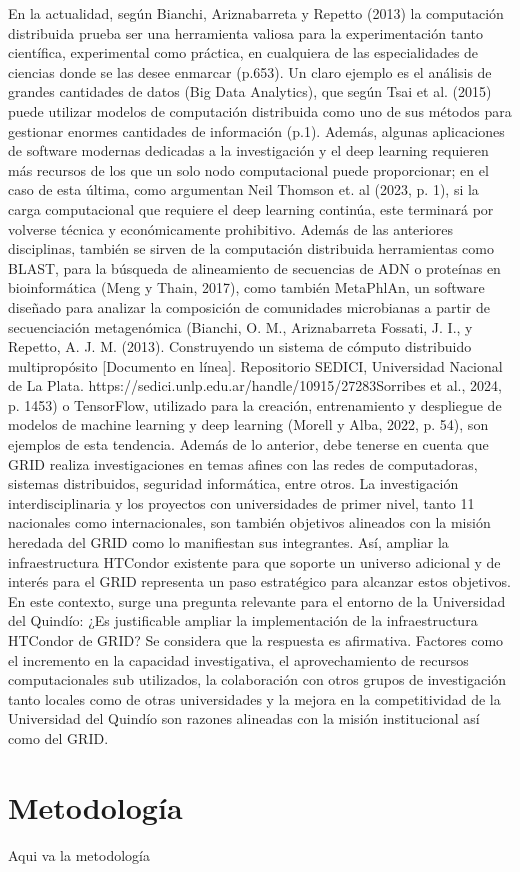 En la actualidad, según Bianchi, Ariznabarreta y Repetto (2013) la computación distribuida
prueba ser una herramienta valiosa para la experimentación tanto científica, experimental como
práctica, en cualquiera de las especialidades de ciencias donde se las desee enmarcar (p.653). Un
claro ejemplo es el análisis de grandes cantidades de datos (Big Data Analytics), que según Tsai
et al. (2015) puede utilizar modelos de computación distribuida como uno de sus métodos para
gestionar enormes cantidades de información (p.1). Además, algunas aplicaciones de software
modernas dedicadas a la investigación y el deep learning requieren más recursos de los que un
solo nodo computacional puede proporcionar; en el caso de esta última, como argumentan Neil
Thomson et. al (2023, p. 1), si la carga computacional que requiere el deep learning continúa,
este terminará por volverse técnica y económicamente prohibitivo. Además de las anteriores
disciplinas, también se sirven de la computación distribuida herramientas como BLAST, para la
búsqueda de alineamiento de secuencias de ADN o proteínas en bioinformática (Meng y Thain,
2017), como también MetaPhlAn, un software diseñado para analizar la composición de
comunidades microbianas a partir de secuenciación metagenómica (Bianchi, O. M.,
Ariznabarreta Fossati, J. I., y Repetto, A. J. M. (2013). Construyendo un sistema de cómputo
distribuido multipropósito [Documento en línea]. Repositorio SEDICI, Universidad Nacional de
La Plata. https://sedici.unlp.edu.ar/handle/10915/27283Sorribes et al., 2024, p. 1453) o
TensorFlow, utilizado para la creación, entrenamiento y despliegue de modelos de machine
learning y deep learning (Morell y Alba, 2022, p. 54), son ejemplos de esta tendencia.
Además de lo anterior, debe tenerse en cuenta que GRID realiza investigaciones en temas afines
con las redes de computadoras, sistemas distribuidos, seguridad informática, entre otros. La
investigación interdisciplinaria y los proyectos con universidades de primer nivel, tanto
11
nacionales como internacionales, son también objetivos alineados con la misión heredada del
GRID como lo manifiestan sus integrantes. Así, ampliar la infraestructura HTCondor existente
para que soporte un universo adicional y de interés para el GRID representa un paso estratégico
para alcanzar estos objetivos.
En este contexto, surge una pregunta relevante para el entorno de la Universidad del Quindío:
¿Es justificable ampliar la implementación de la infraestructura HTCondor de GRID? Se
considera que la respuesta es afirmativa. Factores como el incremento en la capacidad
investigativa, el aprovechamiento de recursos computacionales sub utilizados, la colaboración
con otros grupos de investigación tanto locales como de otras universidades y la mejora en la
competitividad de la Universidad del Quindío son razones alineadas con la misión institucional
así como del GRID.


\chapter*{Metodología}
Aqui va la metodología
